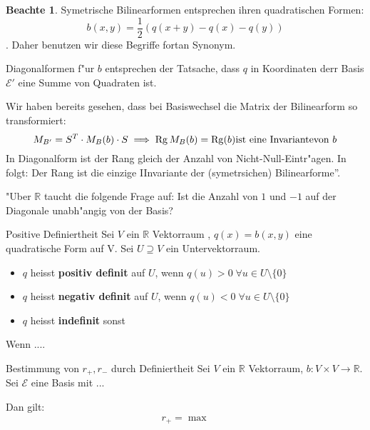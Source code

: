 \documentclass[oneside,fontsize=11pt,paper=a4,BCOR=0mm,DIV=12,automark,headsepline]{scrbook}
\DeclareMathOperator{\mRg}{Rg}
\theoremstyle{remark}
\theoremstyle{definition}
\newtheorem*{notte}{Beachte}
\theoremstyle{definition}
\theoremstyle{remark}
\begin{document}
\begin{notte}
  Symetrische Bilinearformen entsprechen ihren quadratischen Formen:
  \[
    b(x,y) = \frac{1}{2}(q(x+y)-q(x)-q(y))
  \].
  Daher benutzen wir diese Begriffe fortan Synonym.
\end{notte}

\begin{relation}
  Diagonalformen f"ur $b$ entsprechen der Tatsache, dass $q$ in Koordinaten derr
  Basis $\mathcal{E}'$ eine Summe von Quadraten ist.

  Wir haben bereits gesehen, dass bei Basiswechsel die Matrix der Bilinearform
  so transformiert:
  \[
    M_{B'}=S^T\cdot M_B(b)\cdot S \\
    \implies \mRg M_B(b)=\mRg (b) \text{ist eine Invariantevon } b
  \]
  In Diagonalform ist der Rang gleich der Anzahl von Nicht-Null-Eintr"agen. In
  $\mathbb{}$ folgt: Der Rang ist die einzige IInvariante der (symetrsichen)
  Bilinearforme''.

  "Uber $\mathbb{R}$ taucht die folgende Frage auf: Ist die Anzahl von $1$ und
  $-1$ auf der Diagonale unabh"angig von der Basis?
\end{relation}

\begin{definition}{Positive Definiertheit}{}
  Sei $V$ ein $\mathbb{R}$ Vektorraum , $q(x)=b(x,y)$ eine quadratische Form auf
  V. Sei $U\supseteq V$ ein Untervektorraum.

  \begin{itemize}
  \item $q$ heisst \textbf{positiv definit} auf $U$, wenn $q(u) > 0\; \forall
    u\in U\setminus\{0\}$
  \item $q$ heisst \textbf{negativ definit} auf $U$, wenn $q(u) < 0\; \forall
    u\in U\setminus\{0\}$
  \item $q$ heisst \textbf{indefinit} sonst
  \end{itemize}
\end{definition}


\begin{relation}
  Wenn ....
\end{relation}

\begin{satz}{Bestimmung von $r_+, r_-$ durch Definiertheit}
  Sei $V$ ein $\mathbb{R}$ Vektorraum, $b: V\times V \rightarrow \mathbb{R}$.
  Sei $\mathcal{E}$ eine Basis mit ...

  Dan gilt:
  \begin{align*}
    r_+=\max
  \end{align*}
\end{satz}
\end{document}

